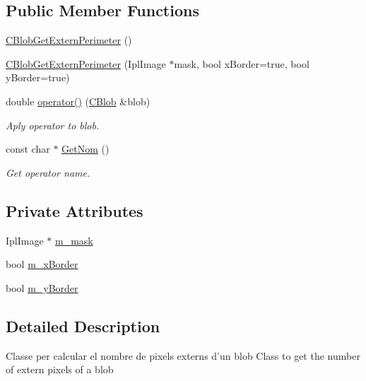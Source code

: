\subsection*{Public Member Functions}
\begin{DoxyCompactItemize}
\item 
\hyperlink{classCBlobGetExternPerimeter_ab3118e7b8f6b8601dd119b3e4f089b7d}{C\-Blob\-Get\-Extern\-Perimeter} ()
\item 
\hyperlink{classCBlobGetExternPerimeter_ad4251d3c3231b4ef304796395d27d7fc}{C\-Blob\-Get\-Extern\-Perimeter} (Ipl\-Image $\ast$mask, bool x\-Border=true, bool y\-Border=true)
\item 
double \hyperlink{classCBlobGetExternPerimeter_a3c506f7355bab0299f1992dcda2e0a0a}{operator()} (\hyperlink{classCBlob}{C\-Blob} \&blob)
\begin{DoxyCompactList}\small\item\em Aply operator to blob. \end{DoxyCompactList}\item 
const char $\ast$ \hyperlink{classCBlobGetExternPerimeter_a0565de9fba118d0de191359934fb59d0}{Get\-Nom} ()
\begin{DoxyCompactList}\small\item\em Get operator name. \end{DoxyCompactList}\end{DoxyCompactItemize}
\subsection*{Private Attributes}
\begin{DoxyCompactItemize}
\item 
Ipl\-Image $\ast$ \hyperlink{classCBlobGetExternPerimeter_afa64b04d0a3cd605dcfb9117361d7252}{m\-\_\-mask}
\item 
bool \hyperlink{classCBlobGetExternPerimeter_a9f735fab175aaf26a169bf404df5202c}{m\-\_\-x\-Border}
\item 
bool \hyperlink{classCBlobGetExternPerimeter_ad33c70e8fa890433930151b39bf77d49}{m\-\_\-y\-Border}
\end{DoxyCompactItemize}


\subsection{Detailed Description}
Classe per calcular el nombre de pixels externs d'un blob Class to get the number of extern pixels of a blob 

